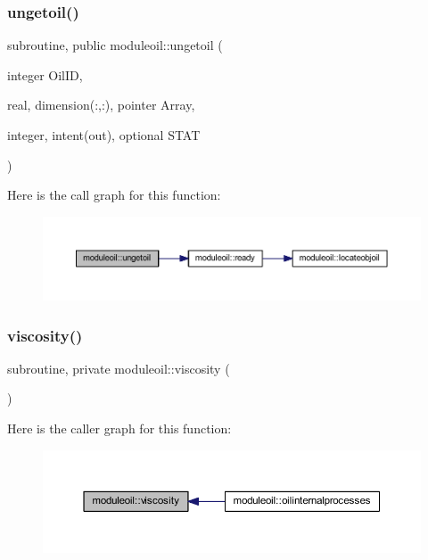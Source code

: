 \subsubsection{\texorpdfstring{ungetoil()}{ungetoil()}}
{\footnotesize\ttfamily subroutine, public moduleoil\+::ungetoil (\begin{DoxyParamCaption}\item[{integer}]{Oil\+ID,  }\item[{real, dimension(\+:,\+:), pointer}]{Array,  }\item[{integer, intent(out), optional}]{S\+T\+AT }\end{DoxyParamCaption})}

Here is the call graph for this function\+:\nopagebreak
\begin{figure}[H]
\begin{center}
\leavevmode
\includegraphics[width=350pt]{namespacemoduleoil_a2fe92325448f8b8b46f0b9a6c44129c1_cgraph}
\end{center}
\end{figure}
\mbox{\label{namespacemoduleoil_a2aaa2968f62ce93c4b499b8b91d86e75}} 
\subsubsection{\texorpdfstring{viscosity()}{viscosity()}}
{\footnotesize\ttfamily subroutine, private moduleoil\+::viscosity (\begin{DoxyParamCaption}{ }\end{DoxyParamCaption})\hspace{0.3cm}{\ttfamily [private]}}

Here is the caller graph for this function\+:\nopagebreak
\begin{figure}[H]
\begin{center}
\leavevmode
\includegraphics[width=350pt]{namespacemoduleoil_a2aaa2968f62ce93c4b499b8b91d86e75_icgraph}
\end{center}
\end{figure}
\mbox{\label{namespacemoduleoil_afaa341d33088f674ca74e6ac763daa2d}} 
